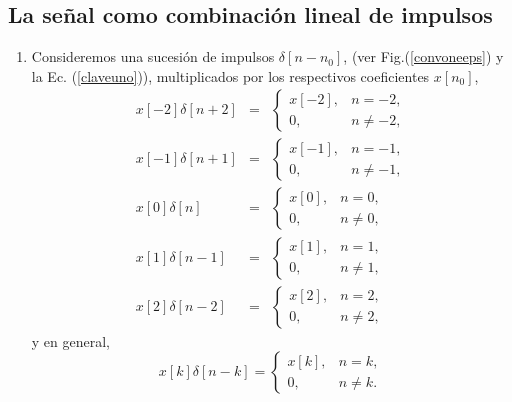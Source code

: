 \subsection{La se\~ {n}al como combinaci\'{o}n lineal de impulsos}

\begin{enumerate}

\item Consideremos una sucesi\'{o}n de impulsos 
 $\delta\left[n - n_{0}\right]$, 
(ver Fig.(\ref{convoneeps}) y la Ec. (\ref{claveuno})), multiplicados por los
  respectivos coeficientes  $x\left[n_{0}\right]$, 
  \begin{eqnarray}
    x[-2]\delta \left[ n+2\right]   &=&     \left\{ \begin{array}{ll}
        x[-2],  & n=-2,                 \\ 
        0,      & n\neq -2,
      \end{array}
    \right.                                         \\
    x[-1]\delta \left[ n+1\right]   &=&     \left\{ \begin{array}{ll}
        x[-1],  & n=-1,                 \\ 
        0,      & n\neq -1,
      \end{array}
    \right.                                                 \\
    x[0]\delta \left[ n\right]      &=&     \left\{ \begin{array}{ll}
        x[0],   & n=0,                  \\ 
        0,      & n\neq 0,
      \end{array}
    \right.                                                 \\
    x[1]\delta \left[ n-1\right]    &=&     \left\{ \begin{array}{ll}
        x[1],   & n=1,                  \\ 
        0,      & n\neq 1,
      \end{array}
    \right.                                                 \\
    x[2]\delta \left[ n-2\right]   &=&     \left\{ \begin{array}{ll}
        x[2],   & n=2,                  \\ 
        0,      & n\neq 2,
      \end{array}
    \right.
  \end{eqnarray}
  y en general,
  \begin{equation}
    x[k]\delta \left[ n-k\right] =  \left\{ \begin{array}{ll}
        x[k],   & n=k,          \\ 
        0,      & n\neq k.
      \end{array}
    \right.
  \end{equation}


\end{enumerate}
